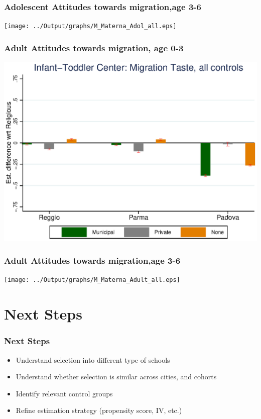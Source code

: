 \documentclass{beamer}
\begin{document}
\begin{frame}\frametitle{Adolescent Attitudes towards migration,age 3-6}
\center
\texttt{[image: ../Output/graphs/M\_Materna\_Adol\_all.eps]}
\end{frame}

\begin{frame}\frametitle{Adult Attitudes towards migration, age 0-3}
\center
\includegraphics[scale=0.7]{../Output/graphs/M_Asilo_Adult_all.eps}
\end{frame}


\begin{frame}\frametitle{Adult Attitudes towards migration,age 3-6}
\center
\texttt{[image: ../Output/graphs/M\_Materna\_Adult\_all.eps]}
\end{frame}

\section{Next Steps}
\begin{frame}\frametitle{Next Steps}
\begin{itemize}
	\item Understand selection into different type of schools
	\item Understand whether selection is similar across cities, and cohorts
	\item Identify relevant control groups
	\item Refine estimation strategy (propensity score, IV, etc.)
\end{itemize}
\end{frame}
\end{document}
